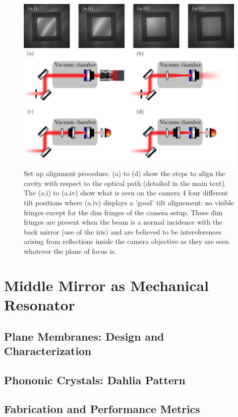 \begin{figure}[h!]
    \centering  
    \includegraphics[width=\textwidth]{./chap5/fig/tilt_alignementB.pdf}
    \caption{Set up alignment procedure. (a) to (d) show the steps to align the cavity with respect to the optical path (detailed in the main text). The (a.i) to (a.iv) show what is seen on the camera 4 four different tilt positions where (a.iv) displays a 'good' tilt alignement: no visible fringes except for the dim fringes of the camera setup. These dim fringes are present when the beam is a normal incidence with the back mirror (use of the iris) and are believed to be intereferences arising from reflections inside the camera objective as they are seen whatever the plane of focus is. }
    \label{fig:tilt}
\end{figure}
\section{Middle Mirror as Mechanical Resonator}
\subsection{Plane Membranes: Design and Characterization}
\subsection{Phononic Crystals: Dahlia Pattern}
\subsection{Fabrication and Performance Metrics}
